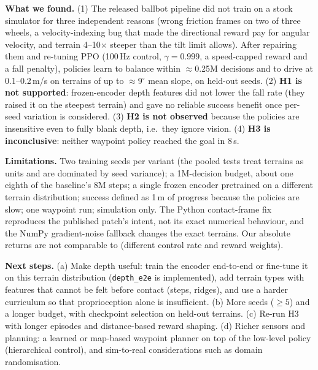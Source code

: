 \label{sec:concl}
\textbf{What we found.} (1) The released ballbot pipeline did not train on a stock simulator for three independent reasons (wrong friction frames on two of three wheels, a velocity-indexing bug that made the directional reward pay for angular velocity, and terrain 4--10$\times$ steeper than the tilt limit allows). After repairing them and re-tuning PPO (100\,Hz control, $\gamma{=}0.999$, a speed-capped reward and a fall penalty), policies learn to balance within $\approx$0.25M decisions and to drive at 0.1--0.2\,m/s on terrains of up to $\approx$9$^\circ$ mean slope, on held-out seeds. (2) \textbf{H1 is not supported}: frozen-encoder depth features did not lower the fall rate (they raised it on the steepest terrain) and gave no reliable success benefit once per-seed variation is considered. (3) \textbf{H2 is not observed} because the policies are insensitive even to fully blank depth, i.e.\ they ignore vision. (4) \textbf{H3 is inconclusive}: neither waypoint policy reached the goal in 8\,s.

\textbf{Limitations.} Two training seeds per variant (the pooled tests treat terrains as units and are dominated by seed variance); a 1M-decision budget, about one eighth of the baseline's 8M steps; a single frozen encoder pretrained on a different terrain distribution; success defined as 1\,m of progress because the policies are slow; one waypoint run; simulation only. The Python contact-frame fix reproduces the published patch's intent, not its exact numerical behaviour, and the NumPy gradient-noise fallback changes the exact terrains. Our absolute returns are not comparable to \cite{salehi2025} (different control rate and reward weights).

\textbf{Next steps.} (a) Make depth useful: train the encoder end-to-end or fine-tune it on this terrain distribution (\texttt{depth\_e2e} is implemented), add terrain types with features that cannot be felt before contact (steps, ridges), and use a harder curriculum so that proprioception alone is insufficient. (b) More seeds ($\ge5$) and a longer budget, with checkpoint selection on held-out terrains. (c) Re-run H3 with longer episodes and distance-based reward shaping. (d) Richer sensors and planning: a learned or map-based waypoint planner on top of the low-level policy (hierarchical control), and sim-to-real considerations such as domain randomisation.
